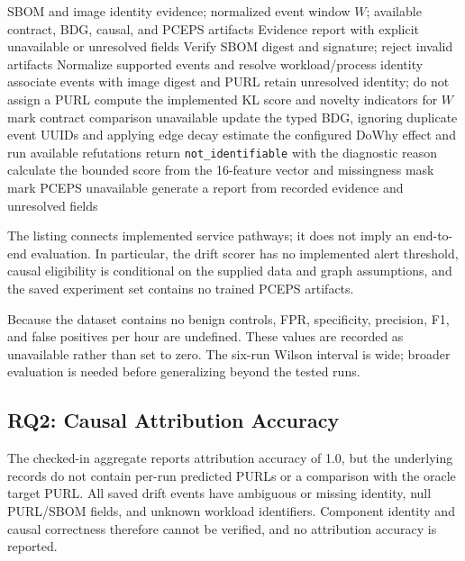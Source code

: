 \documentclass[conference]{IEEEtran}
\begin{document}
\begin{algorithm}[t]
\caption{Evidence-gated PHANTOM processing pathway}
\label{alg:pipeline}
\begin{algorithmic}[1]
\Require SBOM and image identity evidence; normalized event window $W$; available contract, BDG, causal, and PCEPS artifacts
\Ensure Evidence report with explicit unavailable or unresolved fields
\State Verify SBOM digest and signature; reject invalid artifacts
\State Normalize supported events and resolve workload/process identity
  \State associate events with image digest and PURL
\Else
  \State retain unresolved identity; do not assign a PURL
\EndIf
{}
  \State compute the implemented KL score and novelty indicators for $W$
\Else
  \State mark contract comparison unavailable
\EndIf
\State update the typed BDG, ignoring duplicate event UUIDs and applying edge decay
  \State estimate the configured DoWhy effect and run available refutations
\Else
  \State return \texttt{not\_identifiable} with the diagnostic reason
\EndIf
{}
  \State calculate the bounded score from the 16-feature vector and missingness mask
\Else
  \State mark PCEPS unavailable
\EndIf
\State generate a report from recorded evidence and unresolved fields
\end{algorithmic}
\end{algorithm}
The listing connects implemented service pathways; it does not imply an end-to-end evaluation. In particular, the drift scorer has no implemented alert threshold, causal eligibility is conditional on the supplied data and graph assumptions, and the saved experiment set contains no trained PCEPS artifacts.

Because the dataset contains no benign controls, FPR, specificity, precision, F1, and false positives per hour are undefined. These values are recorded as unavailable rather than set to zero. The six-run Wilson interval is wide; broader evaluation is needed before generalizing beyond the tested runs.

\subsection{RQ2: Causal Attribution Accuracy}
The checked-in aggregate reports attribution accuracy of 1.0, but the underlying records do not contain per-run predicted PURLs or a comparison with the oracle target PURL. All saved drift events have ambiguous or missing identity, null PURL/SBOM fields, and unknown workload identifiers. Component identity and causal correctness therefore cannot be verified, and no attribution accuracy is reported.
\end{document}
